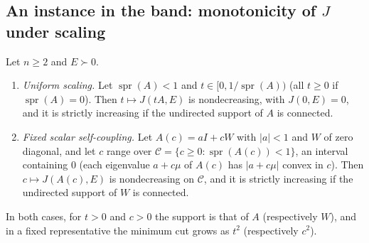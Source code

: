 \subsection{An instance in the band: monotonicity of \texorpdfstring{$J$}{J} under scaling}\label{sec:scaling}
\begin{proposition}\label{prop:scaling}
Let $n\ge2$ and $E\succ0$.
\begin{enumerate}
\item[(a)] \emph{Uniform scaling.} Let $\operatorname{spr}(A)<1$ and $t\in[0,1/\operatorname{spr}(A))$ (all $t\ge0$ if $\operatorname{spr}(A)=0$). Then $t\mapsto J(tA,E)$ is nondecreasing, with $J(0,E)=0$, and it is strictly increasing if the undirected support of $A$ is connected.
\item[(b)] \emph{Fixed scalar self-coupling.} Let $A(c)=aI+cW$ with $|a|<1$ and $W$ of zero diagonal, and let $c$ range over $\mathcal C=\{c\ge0:\operatorname{spr}(A(c))<1\}$, an interval containing $0$ (each eigenvalue $a+c\mu$ of $A(c)$ has $|a+c\mu|$ convex in $c$). Then $c\mapsto J(A(c),E)$ is nondecreasing on $\mathcal C$, and it is strictly increasing if the undirected support of $W$ is connected.
\end{enumerate}
In both cases, for $t>0$ and $c>0$ the support is that of $A$ (respectively $W$), and in a fixed representative the minimum cut grows as $t^2$ (respectively $c^2$). \stA\ \stM
\end{proposition}
